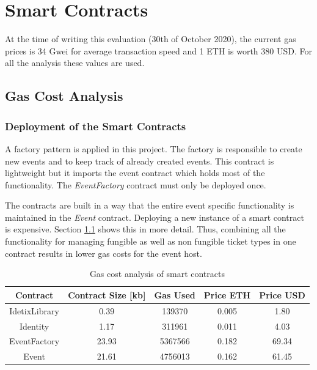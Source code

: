 
\section{Smart Contracts}\label{sec:smart_cont:eval}

At the time of writing this evaluation (30th of October 2020), the current gas prices is 34 Gwei for average transaction speed and 1 ETH is worth 380 USD. For all the analysis these values are used.

\subsection{Gas Cost Analysis}\label{subsection:gas-cost-analysis}

\subsubsection{Deployment of the Smart Contracts}

A factory pattern is applied in this project. The factory is responsible to create new events and to keep track of already created events. This contract is lightweight but it imports the event contract which holds most of the functionality. The \textit{EventFactory} contract must only be deployed once. 

The contracts are built in a way that the entire event specific functionality is maintained in the \textit{Event} contract. Deploying a new instance of a smart contract is expensive. Section \ref{subsection:gas-cost-analysis} shows this in more detail. Thus, combining all the functionality for managing fungible as well as non fungible ticket types in one contract results in lower gas costs for the event host. 

\begin{table}[ht]
\centering
\begin{tabular}{|c|c|c|c|c|}
\hline
\textbf{Contract} & \textbf{Contract Size {[}kb{]}} & \textbf{Gas Used} & \textbf{Price ETH} & \textbf{Price USD} \\ \hline
IdetixLibrary     & 0.39                         & 139370            & 0.005              & 1.80               \\ \hline
Identity          & 1.17                         & 311961            & 0.011              & 4.03               \\ \hline
EventFactory      & 23.93                       & 5367566           & 0.182              & 69.34              \\ \hline
Event             & 21.61                        & 4756013           & 0.162              & 61.45              \\ \hline
\end{tabular}
\caption{Gas cost analysis of smart contracts}
\label{tab:gas-cost-analysis-sc}
\end{table}

